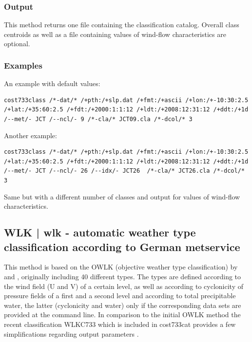 \documentclass[12pt, oneside, a4paper, headsepline, plainheadsepline]{scrbook}
\begin{document}
\subsubsection*{Output}
This method returns one file containing the classification catalog. 
Overall class centroids as well as a file containing values of wind-flow 
characteristics are optional.

\subsubsection*{Examples}
An example with default values:
\begin{lstlisting}
cost733class /*-dat/* /+pth:/+slp.dat /+fmt:/+ascii /+lon:/+-10:30:2.5 /+lat:/+35:60:2.5 /+fdt:/+2000:1:1:12 /+ldt:/+2008:12:31:12 /+ddt:/+1d /--met/- JCT /--ncl/- 9 /*-cla/* JCT09.cla /*-dcol/* 3 
\end{lstlisting}
Another example:
\begin{lstlisting}
cost733class /*-dat/* /+pth:/+slp.dat /+fmt:/+ascii /+lon:/+-10:30:2.5 /+lat:/+35:60:2.5 /+fdt:/+2000:1:1:12 /+ldt:/+2008:12:31:12 /+ddt:/+1d /--met/- JCT /--ncl/- 26 /--idx/- JCT26  /*-cla/* JCT26.cla /*-dcol/* 3 
\end{lstlisting}
Same but with a different number of classes and output for values of wind-flow characteristics.

\subsection{WLK | wlk - automatic weather type classification according to German metservice}


This method is based on the OWLK (objective weather type classification) by \citet{Dittmann1995} and \citet{Bissolli2003}, originally including 40 different types. The types are defined according to the wind field (U and V) of a certain level, as well as according to cyclonicity of pressure fields of a first and a second level and according to total precipitable water, the latter (cyclonicity and water) only if the corresponding data sets are provided at the command line. 
In comparison to the initial OWLK method the recent classification WLKC733 which is included in cost733cat provides a few simplifications regarding output parameters \citep[see][]{Philipp2010}.
\end{document}
